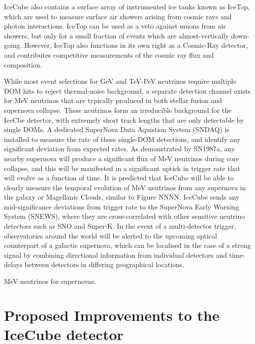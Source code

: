 IceCube also contains a surface array of instrumented ice tanks known as IceTop, which are used to measure surface air showers arising from cosmic rays and photon interactions. IceTop can be used as a veto against muons from air showers, but only for a small fraction of events which are almost-vertically down-going. However, IceTop also functions in its own right as a Cosmic-Ray detector, and contributes competitive measurements of the cosmic ray flux and composition.

While most event selections for GeV and TeV-PeV neutrinos require multiple DOM hits to reject thermal-noise background, a separate detection channel exists for MeV neutrinos that are typically produced in both stellar fusion and supernova collapse. These neutrinos form an irreducible background for the IceCbe detector, with extremely short track lengths that are only detectable by single DOMs. A dedicated SuperNova Data Aquistion System (SNDAQ) is installed to measure the rate of these single-DOM detections, and identify any significant deviation from expected rates. As demonstrated by SN1987a, any nearby supernova will produce a significant flux of MeV neutrinos during core collapse, and this will be manifested in a significant uptick in trigger rate that will evolve as a function of time. It is predicted that IceCube will be able to clearly measure the temporal evolution of MeV neutrinos from any supernova in the galaxy or Magellanic Clouds, similar to Figure NNNN. IceCube sends any mid-significance deviations from trigger rate to the SuperNova Early Warning System (SNEWS), where they are cross-correlated with other sensitive neutrino detectors such as SNO and Super-K. In the event of a multi-detector trigger, observatories around the world will be alerted to the upcoming optical counterpart of a galactic supernova, which can be localised in the case of a strong signal by combining directional information from individual detectors and time-delays between detectors in differing geographical locations. 



MeV neutrinos for supernovae.

\section{Proposed Improvements to the IceCube detector}

